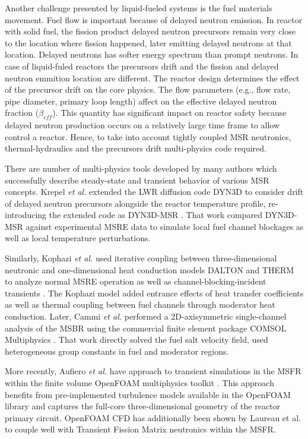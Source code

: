 Another challenge presented by liquid-fueled systems is the fuel materials movement. Fuel flow is important because of delayed neutron emission. In reactor with solid fuel, the fission product delayed neutron precursors remain very close to the location where fission happened, later emitting delayed neutrons at that location. Delayed neutrons has softer energy spectrum than prompt neutrons. In case of liquid-fuled reactors the precursors drift and the fission and delayed neutron emmition location are different. The reactor design determines the effect of the precursor drift on the core physics. The flow parameters (e.g., flow rate, pipe diameter, primary loop length) affect on the effective delayed neutron fraction ($\beta_{eff}$). This quantity has significant impact on reactor safety because delayed neutron production occurs on a relatively large time frame to allow control a reactor. Hence, to take into account tightly coupled \gls{MSR} neutronics, thermal-hydraulics and the precursors drift multi-physics code required.

There are number of multi-physics tools developed by many authors which successfully describe steady-state and transient behavior of various \gls{MSR} concepts. Krepel \emph{et al.} extended the \gls{LWR} diffusion code DYN3D to consider drift of delayed neutron precursors alongside the reactor temperature profile, re-introducing the extended code as DYN3D-MSR \cite{krepel_dyn3d-msr_2007}. That work compared DYN3D-MSR against experimental \gls{MSRE} data to simulate local fuel channel blockages as well as local temperature perturbations.

Similarly, Kophazi \emph{et al.} used iterative coupling between three-dimensional neutronic and one-dimensional heat conduction models DALTON and THERM to analyze normal \gls{MSRE} operation as well as channel-blocking-incident transients \cite{kophazi_development_2009}. The Kophazi model added entrance effects of heat transfer coefficients as well as thermal coupling between fuel channels through moderator heat conduction. Later, Cammi \emph{et al.} performed a 2D-axisymmetric single-channel analysis of the \gls{MSBR} using the commercial finite element package COMSOL Multiphysics \cite{cammi_multi-physics_2011}. That work directly solved the fuel salt velocity field, used heterogeneous group constants in fuel and moderator regions.  

More recently, Aufiero \emph{et al.} \cite{aufiero_development_2014} have approach to transient simulations in the \gls{MSFR} within the finite volume
OpenFOAM multiphysics toolkit \cite{weller_tensorial_1998}.  This approach
benefits from pre-implemented turbulence models available in the OpenFOAM
library and captures the full-core three-dimensional geometry of the reactor
primary circuit.  OpenFOAM \gls{CFD} has additionally been shown by Laureau et
al. \cite{laureau_transient_2017} to couple well with Transient Fission Matrix
neutronics within the \gls{MSFR}.

